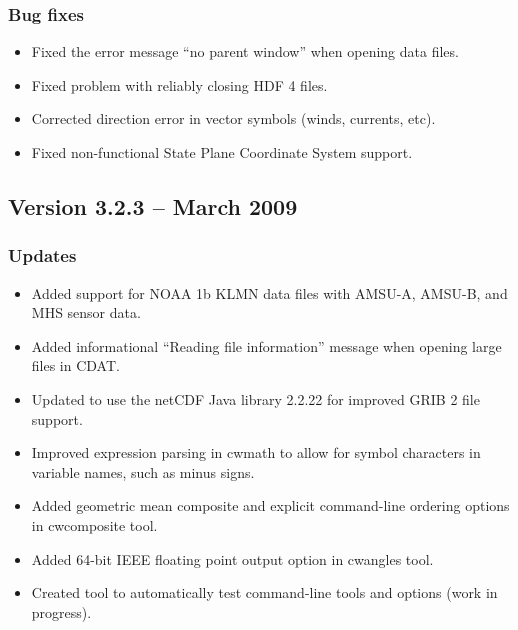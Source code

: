 \subsubsection*{ Bug fixes}
\begin{itemize}

  \item Fixed the error message ``no parent window'' when opening data files.

  \item Fixed problem with reliably closing HDF 4 files.

  \item Corrected direction error in vector symbols (winds, currents, etc).

  \item Fixed non-functional State Plane Coordinate System support.

\end{itemize}


\subsection*{Version 3.2.3 -- March 2009}

\subsubsection*{ Updates}

\begin{itemize}

  \item Added support for NOAA 1b KLMN data files with AMSU-A,
    AMSU-B, and MHS sensor data.

  \item Added informational ``Reading file information'' message
    when opening large files in CDAT.

  \item Updated to use the netCDF Java library 2.2.22 for
    improved GRIB 2 file support.

  \item Improved expression parsing in cwmath to allow for symbol
    characters in variable names, such as minus signs.

  \item Added geometric mean composite and explicit command-line
    ordering options in cwcomposite tool.

  \item Added 64-bit IEEE floating point output option in
    cwangles tool.

  \item Created tool to automatically test command-line tools and
    options (work in progress).

\end{itemize}

